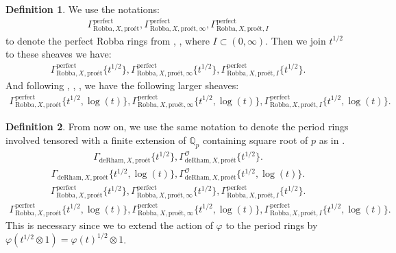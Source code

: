\documentclass[12pt]{book}
\theoremstyle{definition}
\newtheorem{definition}{Definition}
\begin{document}
\begin{definition}
We use the notations:
\begin{align}
\Gamma^\mathrm{perfect}_{\text{Robba},X,\text{pro\'et}},\Gamma^\mathrm{perfect}_{\text{Robba},X,\text{pro\'et},\infty},\Gamma^\mathrm{perfect}_{\text{Robba},X,\text{pro\'et},I}
\end{align}
to denote the perfect Robba rings from \cite{KL1}, \cite{KL2}, where $I\subset (0,\infty)$. Then we join $t^{1/2}$ to these sheaves we have:
\begin{align}
\Gamma^\mathrm{perfect}_{\text{Robba},X,\text{pro\'et}}\{t^{1/2}\},\Gamma^\mathrm{perfect}_{\text{Robba},X,\text{pro\'et},\infty}\{t^{1/2}\},\Gamma^\mathrm{perfect}_{\text{Robba},X,\text{pro\'et},I}\{t^{1/2}\}.
\end{align}
And following \cite{BL1}, \cite{BL2}, \cite{Fon1}, \cite{BHS} we have the following larger sheaves:
\begin{align}
\Gamma^\mathrm{perfect}_{\text{Robba},X,\text{pro\'et}}\{t^{1/2},\log(t)\},\Gamma^\mathrm{perfect}_{\text{Robba},X,\text{pro\'et},\infty}\{t^{1/2},\log(t)\},\Gamma^\mathrm{perfect}_{\text{Robba},X,\text{pro\'et},I}\{t^{1/2},\log(t)\}.
\end{align} 
\end{definition}



\begin{definition}
From now on, we use the same notation to denote the period rings involved tensored with a finite extension of $\mathbb{Q}_p$ containing square root of $p$ as in \cite{BS}.
\begin{align}
\Gamma_{\text{deRham},X,\text{pro\'et}}\{t^{1/2}\},\Gamma^\mathcal{O}_{\text{deRham},X,\text{pro\'et}}\{t^{1/2}\}.
\end{align}
\begin{align}
\Gamma_{\text{deRham},X,\text{pro\'et}}\{t^{1/2},\log(t)\},\Gamma^\mathcal{O}_{\text{deRham},X,\text{pro\'et}}\{t^{1/2},\log(t)\}.
\end{align}
\begin{align}
\Gamma^\mathrm{perfect}_{\text{Robba},X,\text{pro\'et}}\{t^{1/2}\},\Gamma^\mathrm{perfect}_{\text{Robba},X,\text{pro\'et},\infty}\{t^{1/2}\},\Gamma^\mathrm{perfect}_{\text{Robba},X,\text{pro\'et},I}\{t^{1/2}\}.
\end{align}
\begin{align}
\Gamma^\mathrm{perfect}_{\text{Robba},X,\text{pro\'et}}\{t^{1/2},\log(t)\},\Gamma^\mathrm{perfect}_{\text{Robba},X,\text{pro\'et},\infty}\{t^{1/2},\log(t)\},\Gamma^\mathrm{perfect}_{\text{Robba},X,\text{pro\'et},I}\{t^{1/2},\log(t)\}.
\end{align}
This is necessary since we to extend the action of $\varphi$ to the period rings by $\varphi(t^{1/2}\otimes 1)=\varphi(t)^{1/2}\otimes 1$.
\end{definition}
\end{document}

